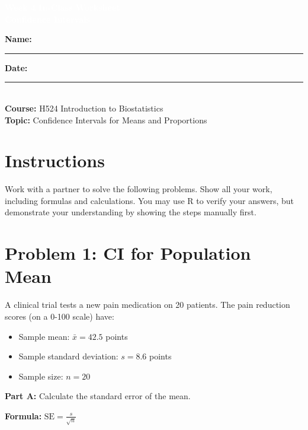\documentclass[11pt]{article}
\title{}
\author{}
\date{}
\begin{document}
\begin{tcolorbox}[colback=osaorange,colframe=black,boxrule=2pt,arc=0pt,left=6pt,right=6pt,top=10pt,bottom=10pt]
\centering
\textcolor{white}{\textbf{\Large Week 4 In-Class Worksheet}}\\
\textcolor{white}{\textbf{\large Confidence Intervals}}
\end{tcolorbox}

\vspace{8pt}

\noindent\textbf{Name:} \rule{8cm}{0.4pt} \hfill \textbf{Date:} \rule{4cm}{0.4pt}\\[0.5ex]
\textbf{Course:} H524 Introduction to Biostatistics\\
\textbf{Topic:} Confidence Intervals for Means and Proportions

\vspace{8pt}

\section*{Instructions}
Work with a partner to solve the following problems. Show all your work, including formulas and calculations. You may use R to verify your answers, but demonstrate your understanding by showing the steps manually first.

\vspace{12pt}

\section{Problem 1: CI for Population Mean}

A clinical trial tests a new pain medication on 20 patients. The pain reduction scores (on a 0-100 scale) have:
\begin{itemize}
\item Sample mean: $\bar{x} = 42.5$ points
\item Sample standard deviation: $s = 8.6$ points
\item Sample size: $n = 20$
\end{itemize}

\vspace{6pt}

\textbf{Part A:} Calculate the standard error of the mean.

\vspace{0.3cm}

\textbf{Formula:} $\text{SE} = \frac{s}{\sqrt{n}}$
\end{document}
